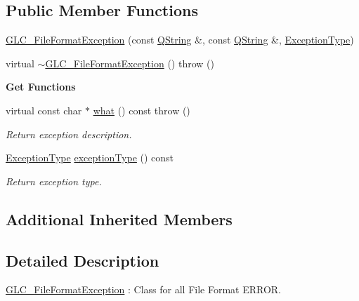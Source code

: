 \subsection*{Public Member Functions}
\begin{DoxyCompactItemize}
\item 
\hyperlink{class_g_l_c___file_format_exception_ae60fc324c5a48be03d483875bf74e979}{G\-L\-C\-\_\-\-File\-Format\-Exception} (const \hyperlink{group___u_a_v_objects_plugin_gab9d252f49c333c94a72f97ce3105a32d}{Q\-String} \&, const \hyperlink{group___u_a_v_objects_plugin_gab9d252f49c333c94a72f97ce3105a32d}{Q\-String} \&, \hyperlink{class_g_l_c___file_format_exception_ab28c5be439dcc7226f9fa041ff87dc18}{Exception\-Type})
\item 
virtual \hyperlink{class_g_l_c___file_format_exception_a689e3ce05e0011ff57b03f1b34ecac02}{$\sim$\-G\-L\-C\-\_\-\-File\-Format\-Exception} ()  throw ()
\end{DoxyCompactItemize}
\begin{Indent}{\bf Get Functions}\par
\begin{DoxyCompactItemize}
\item 
virtual const char $\ast$ \hyperlink{class_g_l_c___file_format_exception_acc3893e7d2818bc620a58b6ae1698b7a}{what} () const   throw ()
\begin{DoxyCompactList}\small\item\em Return exception description. \end{DoxyCompactList}\item 
\hyperlink{class_g_l_c___file_format_exception_ab28c5be439dcc7226f9fa041ff87dc18}{Exception\-Type} \hyperlink{class_g_l_c___file_format_exception_a41a45088e854d69ef8a105086464aa5d}{exception\-Type} () const 
\begin{DoxyCompactList}\small\item\em Return exception type. \end{DoxyCompactList}\end{DoxyCompactItemize}
\end{Indent}
\subsection*{Additional Inherited Members}


\subsection{Detailed Description}
\hyperlink{class_g_l_c___file_format_exception}{G\-L\-C\-\_\-\-File\-Format\-Exception} \-: Class for all File Format E\-R\-R\-O\-R. 

